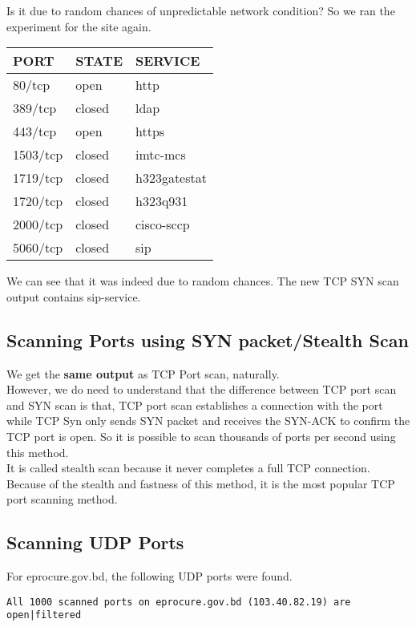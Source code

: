 \documentclass[11pt]{article}
\begin{document}
Is it due to random chances of unpredictable network condition? So we ran the experiment for the site again.\\
\begin{center}
\begin{tabular}{lll}
PORT & STATE & SERVICE\\
\hline
80/tcp & open & http\\
389/tcp & closed & ldap\\
443/tcp & open & https\\
1503/tcp & closed & imtc-mcs\\
1719/tcp & closed & h323gatestat\\
1720/tcp & closed & h323q931\\
2000/tcp & closed & cisco-sccp\\
5060/tcp & closed & sip\\
\end{tabular}
\end{center}
We can see that it was indeed due to random chances. The new TCP SYN scan output contains sip-service.\\
\subsection{Scanning Ports using SYN packet/Stealth Scan}
\label{sec:org05aea21}
We get the \textbf{\textbf{\textbf{same output}}} as TCP Port scan, naturally.\\
However, we do need to understand that the difference between TCP port scan and SYN scan is that, TCP port scan establishes a connection with the port while TCP Syn only sends SYN packet and receives the SYN-ACK to confirm the TCP port is open. So it is possible to scan thousands of ports per second using this method.\\
It is called stealth scan because it never completes a full TCP connection. Because of the stealth and fastness of this method, it is the most popular TCP port scanning method.\\
\subsection{Scanning UDP Ports}
\label{sec:orgbcc5f2b}
For eprocure.gov.bd, the following UDP ports were found.\\
\begin{verbatim}
All 1000 scanned ports on eprocure.gov.bd (103.40.82.19) are open|filtered
\end{verbatim}
\end{document}
